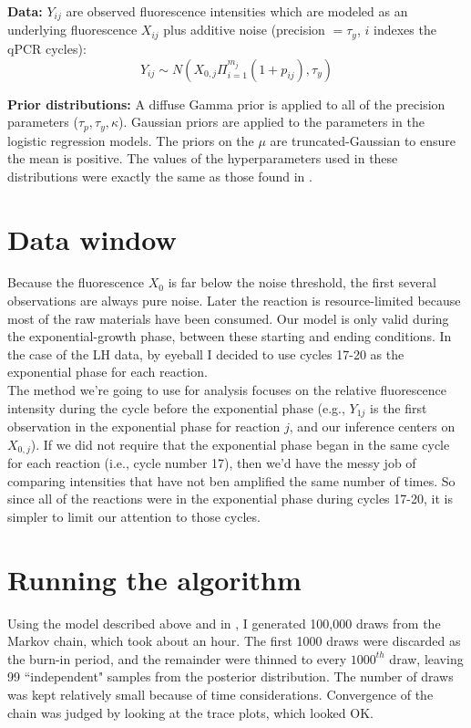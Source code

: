 \documentclass[12pt]{article}
\begin{document}
\textbf{Data:} $Y_{ij}$ are observed fluorescence intensities which are modeled as an underlying fluorescence $X_{ij}$ plus additive noise (precision $=\tau_y$, $i$ indexes the qPCR cycles):
\[
    Y_{ij} \sim N(X_{0,j} \Pi_{i=1}^{m_j} (1+p_{ij}), \tau_y)
\]


\textbf{Prior distributions:} A diffuse Gamma prior is applied to all of the precision parameters ($\tau_p, \tau_y, \kappa$). Gaussian priors are applied to the parameters in the logistic regression models. The priors on the $\mu$ are truncated-Gaussian to ensure the mean is positive. The values of the hyperparameters used in these distributions were exactly the same as those found in \cite{norway:2010}.\\


\section{Data window}
Because the fluorescence $X_0$ is far below the noise threshold, the first several observations are always pure noise. Later the reaction is resource-limited because most of the raw materials have been consumed. Our model is only valid during the exponential-growth phase, between these starting and ending conditions. In the case of the LH data, by eyeball I decided to use cycles 17-20 as the exponential phase for each reaction.\\

The method we're going to use for analysis focuses on the relative fluorescence intensity during the cycle before the exponential phase (e.g., $Y_{1j}$ is the first observation in the exponential phase for reaction $j$, and our inference centers on $X_{0,j}$). If we did not require that the exponential phase began in the same cycle for each reaction (i.e., cycle number 17), then we'd have the messy job of comparing intensities that have not ben amplified the same number of times. So since all of the reactions were in the exponential phase during cycles 17-20, it is simpler to limit our attention to those cycles.\\

\section{Running the algorithm}
Using the model described above and in \cite{norway:2010}, I generated 100,000 draws from the Markov chain, which took about an hour. The first 1000 draws were discarded as the burn-in period, and the remainder were thinned to every $1000^{th}$ draw, leaving 99 ``independent" samples from the posterior distribution. The number of draws was kept relatively small because of time considerations. Convergence of the chain was judged by looking at the trace plots, which looked OK.\\
\end{document}
